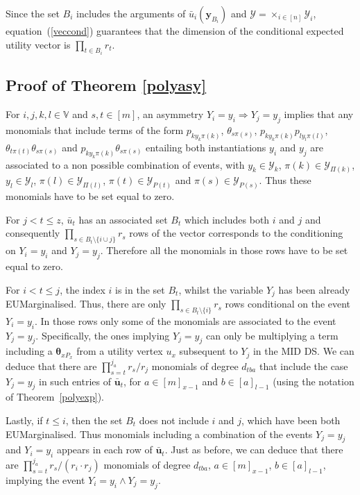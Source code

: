 Since the set $B_i$ includes the arguments of $\bar{u}_i(\bm{y}_{B_i})$ and $\bm{\mathcal{Y}}=\times_{i\in[n]}\mathcal{Y}_i$, equation~(\ref{veccond}) guarantees that the dimension of the conditional expected utility vector is $\prod_{t\in B_i}r_t$.

\subsection{Proof of Theorem \ref{polyasy}}
\label{cippu}
For $i,j,k,l\in\mathbb{V}$ and $s,t\in [m]$, an asymmetry $Y_i=y_i\Rightarrow Y_j=y_j$ implies that any monomials that include terms of the form $p_{ky_k\pi(k)}$, $\theta_{s\pi(s)}$, $p_{ky_k\pi(k)}p_{ly_l\pi(l)}$, $\theta_{t\pi(t)}\theta_{s\pi(s)}$ and $p_{ky_k\pi(k)}\theta_{s\pi(s)}$ entailing both instantiations $y_i$ and $y_j$ are associated to a non possible combination of events, with $y_k\in\mathcal{Y}_k$, $\pi(k)\in\mathcal{Y}_{\Pi(k)}$, $y_l\in\mathcal{Y}_l$, $\pi(l)\in\mathcal{Y}_{\Pi(l)}$, $\pi(t)\in\mathcal{Y}_{P(t)}$ and  $\pi(s)\in\mathcal{Y}_{P(s)}$. Thus these monomials have to be set equal to zero. 

For $j<t\leq z$, $\bar{u}_t$ has an associated set $B_t$ which includes both $i$ and $j$ and consequently $\prod_{s\in B_t\setminus \{i\cup j\}}r_s$ rows of the vector corresponds to the conditioning on $Y_i=y_i$ and $Y_j=y_j$. Therefore all the monomials in those rows have to be set equal to zero.

For $i<t\leq j$, the index $i$ is in the set $B_t$, whilst the variable $Y_j$ has been already EUMarginalised. Thus, there are only $\prod_{s\in B_t\setminus \{i\}}r_s$ rows conditional on the event $Y_i=y_i$. In those rows only some of the monomials are associated to the event $Y_j=y_j$. Specifically, the ones implying $Y_j=y_j$ can only be multiplying a term including a $\bm{\theta}_{xP_x}$ from a utility vertex $u_x$ subsequent to $Y_j$ in the MID DS. We can deduce that there are 
$
\prod_{s=t}^{j_a}r_s/r_j
$ monomials of degree $d_{tba}$ that include the case $Y_j=y_j$ in such entries of $\bar{\bm{u}}_t$, for $a\in [m]_{x-1}$ and $b\in[a]_{l-1}$ (using the notation of Theorem~\ref{polyexp}).

Lastly, if $t\leq i$, then the set $B_t$ does not include $i$ and $j$, which have been both EUMarginalised. Thus monomials including a combination of the events $Y_j=y_j$ and $Y_i=y_i$ appears in each row of $\bar{\bm{u}}_t$. Just as before, we can deduce that there are $\prod_{s=t}^{j_a}r_s/(r_i\cdot r_j)$ monomials of degree $d_{tba}$, $a\in [m]_{x-1}$, $b\in[a]_{l-1}$, implying the event $Y_i=y_i\land Y_j=y_j$.  
